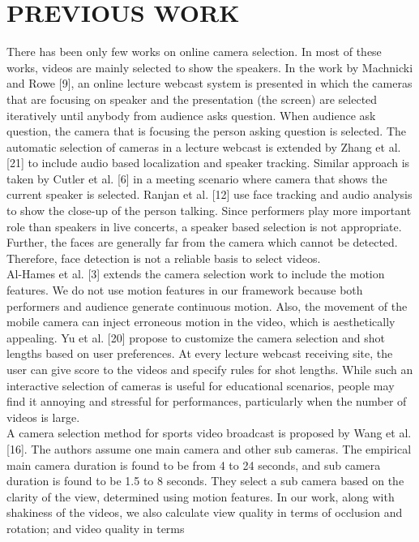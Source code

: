 \documentclass{sig-alternate}
\begin{document}
{{{\section{PREVIOUS WORK}
There has been only few works on online camera selection. In
most of these works, videos are mainly selected to show the speakers.
In the work by Machnicki and Rowe [9], an online lecture
webcast system is presented in which the cameras that are focusing
on speaker and the presentation (the screen) are selected iteratively
until anybody from audience asks question. When audience ask
question, the camera that is focusing the person asking question is
selected. The automatic selection of cameras in a lecture webcast
is extended by Zhang et al. [21] to include audio based localization
and speaker tracking. Similar approach is taken by Cutler et al. [6]
in a meeting scenario where camera that shows the current speaker
is selected. Ranjan et al. [12] use face tracking and audio analysis
to show the close-up of the person talking. Since performers
play more important role than speakers in live concerts, a speaker
based selection is not appropriate. Further, the faces are generally
far from the camera which cannot be detected. Therefore, face detection
is not a reliable basis to select videos.\\
Al-Hames et al. [3] extends the camera selection work to include
the motion features. We do not use motion features in our framework
because both performers and audience generate continuous
motion. Also, the movement of the mobile camera can inject erroneous
motion in the video, which is aesthetically appealing. Yu et
al. [20] propose to customize the camera selection and shot lengths
based on user preferences. At every lecture webcast receiving site,
the user can give score to the videos and specify rules for shot
lengths. While such an interactive selection of cameras is useful
for educational scenarios, people may find it annoying and stressful
for performances, particularly when the number of videos is
large.\\
A camera selection method for sports video broadcast is proposed
by Wang et al. [16]. The authors assume one main camera
and other sub cameras. The empirical main camera duration is
found to be from 4 to 24 seconds, and sub camera duration is found
to be 1.5 to 8 seconds. They select a sub camera based on the clarity
of the view, determined using motion features. In our work,
along with shakiness of the videos, we also calculate view quality
in terms of occlusion and rotation; and video quality in terms
}}}
\end{document}
